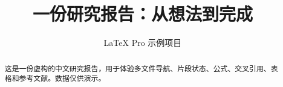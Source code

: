 \documentclass[UTF8,fontset=fandol]{ctexart}
\title{一份研究报告：从想法到完成}
\author{LaTeX Pro 示例项目}
\date{}
\begin{document}
\maketitle
\begin{abstract}这是一份虚构的中文研究报告，用于体验多文件导航、片段状态、公式、交叉引用、表格和参考文献。数据仅供演示。\end{abstract}
\tableofcontents






\end{document}
